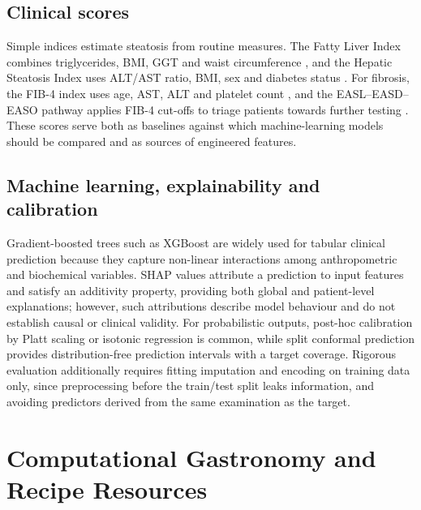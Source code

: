 \subsection{Clinical scores}

Simple indices estimate steatosis from routine measures. The Fatty Liver Index combines triglycerides, BMI, GGT and waist circumference \cite{bedogni2006}, and the Hepatic Steatosis Index uses ALT/AST ratio, BMI, sex and diabetes status \cite{lee2010}. For fibrosis, the FIB-4 index uses age, AST, ALT and platelet count \cite{sterling2006}, and the EASL--EASD--EASO pathway applies FIB-4 cut-offs to triage patients towards further testing \cite{easl2024}. These scores serve both as baselines against which machine-learning models should be compared and as sources of engineered features.

\subsection{Machine learning, explainability and calibration}

Gradient-boosted trees such as XGBoost \cite{chen2016xgboost} are widely used for tabular clinical prediction because they capture non-linear interactions among anthropometric and biochemical variables. SHAP values \cite{lundberg2017} attribute a prediction to input features and satisfy an additivity property, providing both global and patient-level explanations; however, such attributions describe model behaviour and do not establish causal or clinical validity. For probabilistic outputs, post-hoc calibration by Platt scaling \cite{platt1999} or isotonic regression is common, while split conformal prediction \cite{vovk2005} provides distribution-free prediction intervals with a target coverage. Rigorous evaluation additionally requires fitting imputation and encoding on training data only, since preprocessing before the train/test split leaks information, and avoiding predictors derived from the same examination as the target.

\section{Computational Gastronomy and Recipe Resources}
\label{sec:lr-gastro}

